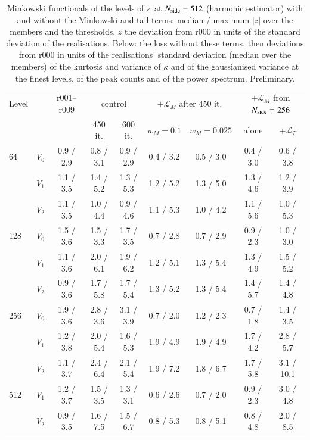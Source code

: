 \documentclass{aa}
\newcommand{\nside}{N_{\rm side}}
\begin{document}
\begin{table}
\caption{Minkowski functionals of the levels of $\kappa$ at $\nside=512$ (harmonic estimator) with and without the Minkowski and tail terms: median / maximum $|z|$ over the members and the thresholds, $z$ the deviation from r000 in units of the standard deviation of the realisations. Below: the loss without these terms, then deviations from r000 in units of the realisations' standard deviation (median over the members) of the kurtosis and variance of $\kappa$ and of the gaussianised variance at the finest levels, of the peak counts and of the power spectrum. Preliminary.}
\label{tab:mink512}
\centering\small\setlength{\tabcolsep}{4.5pt}
\begin{tabular}{llccccccc}
\hline\hline
Level & & r001--r009 & \multicolumn{2}{c}{control} & \multicolumn{2}{c}{$+\mathcal{L}_M$ after 450 it.} & \multicolumn{2}{c}{$+\mathcal{L}_M$ from $\nside=256$} \\
 & & & 450 it. & 600 it. & $w_M=0.1$ & $w_M=0.025$ & alone & $+\mathcal{L}_T$ \\
\hline
64 & $V_0$ & 0.9 / 2.9 & 0.8 / 3.1 & 0.9 / 2.9 & 0.4 / 3.2 & 0.5 / 3.0 & 0.4 / 3.0 & 0.6 / 3.8 \\
   & $V_1$ & 1.1 / 3.5 & 1.4 / 5.2 & 1.3 / 5.3 & 1.2 / 5.2 & 1.3 / 5.0 & 1.3 / 4.6 & 1.2 / 3.9 \\
   & $V_2$ & 1.1 / 3.5 & 1.0 / 4.4 & 0.9 / 4.6 & 1.1 / 5.3 & 1.0 / 4.2 & 1.1 / 5.6 & 1.0 / 5.3 \\
128 & $V_0$ & 1.5 / 3.6 & 1.5 / 3.3 & 1.7 / 3.5 & 0.7 / 2.8 & 0.7 / 2.9 & 0.9 / 2.3 & 1.0 / 3.0 \\
    & $V_1$ & 1.1 / 3.6 & 2.0 / 6.1 & 1.9 / 6.2 & 1.2 / 5.1 & 1.3 / 5.4 & 1.3 / 4.9 & 1.5 / 5.2 \\
    & $V_2$ & 0.9 / 3.6 & 1.7 / 5.8 & 1.7 / 5.4 & 1.3 / 5.2 & 1.3 / 5.4 & 1.4 / 5.7 & 1.4 / 4.8 \\
256 & $V_0$ & 1.9 / 3.6 & 2.8 / 3.6 & 3.1 / 3.9 & 0.7 / 2.0 & 1.2 / 2.3 & 0.7 / 1.8 & 1.4 / 3.5 \\
    & $V_1$ & 1.2 / 3.8 & 2.0 / 5.4 & 1.6 / 5.3 & 1.9 / 4.9 & 1.9 / 4.9 & 1.7 / 4.2 & 2.8 / 5.7 \\
    & $V_2$ & 1.1 / 3.7 & 2.4 / 6.4 & 2.1 / 5.4 & 1.9 / 7.2 & 1.8 / 6.7 & 1.7 / 5.8 & 3.1 / 10.1 \\
512 & $V_1$ & 1.2 / 3.7 & 1.5 / 3.5 & 1.3 / 3.1 & 0.6 / 2.6 & 0.7 / 2.0 & 0.9 / 2.3 & 3.0 / 4.8 \\
    & $V_2$ & 0.9 / 3.5 & 1.6 / 7.5 & 1.5 / 6.7 & 0.8 / 5.3 & 0.8 / 5.1 & 0.8 / 4.8 & 2.0 / 8.5 \\

\end{tabular}
\end{table}
\end{document}
